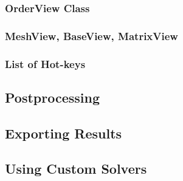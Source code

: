 \subsubsection{OrderView Class}
\subsubsection{MeshView, BaseView, MatrixView}
\subsubsection{List of Hot-keys}



\subsection{Postprocessing}




\subsection{Exporting Results}



\subsection{Using Custom Solvers}
